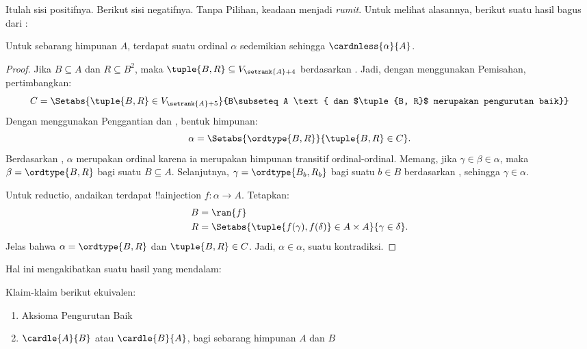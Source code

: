 \documentclass[../../../include/open-logic-section]{subfiles}
\begin{document}

Itulah sisi positifnya. Berikut sisi negatifnya. Tanpa Pilihan, keadaan
menjadi \emph{rumit}. Untuk melihat alasannya, berikut suatu hasil bagus dari
\cite{Hartogs1915}:

\begin{lem}
Untuk sebarang himpunan $A$, terdapat suatu ordinal $\alpha$ sedemikian
sehingga $\cardnless{\alpha}{A}$.
\end{lem}

\begin{proof}
Jika $B \subseteq A$ dan $R \subseteq B^2$, maka $\tuple{B, R} \subseteq
V_{\setrank{A}+4}$ berdasarkan
. Jadi, dengan
menggunakan Pemisahan, pertimbangkan:
\[
	C = \Setabs{\tuple{B, R} \in V_{\setrank{A}+5}}{B\subseteq A
	\text{ dan $\tuple{B, R}$ merupakan pengurutan baik}}
\]
Dengan menggunakan Penggantian dan
, bentuk himpunan:
\[
	\alpha = \Setabs{\ordtype{B, R}}{\tuple{B, R} \in C}.
\]
Berdasarkan , $\alpha$
merupakan ordinal karena ia merupakan himpunan transitif ordinal-ordinal.
Memang, jika $\gamma \in \beta \in \alpha$, maka
$\beta = \ordtype{B, R}$ bagi suatu $B \subseteq A$. Selanjutnya,
$\gamma = \ordtype{B_b, R_b}$ bagi suatu $b \in B$ berdasarkan
, sehingga
$\gamma \in \alpha$.

Untuk reductio, andaikan terdapat !!a{injection}
$f \colon \alpha \to A$. Tetapkan:
\begin{align*}
	B &= \ran{f}\\
	R &= \Setabs{\tuple{f(\gamma), f(\delta)} \in A \times A}
	{\gamma \in \delta}.
\end{align*}
Jelas bahwa $\alpha = \ordtype{B, R}$ dan $\tuple{B, R} \in C$. Jadi,
$\alpha \in \alpha$, suatu kontradiksi.
\end{proof}

Hal ini mengakibatkan suatu hasil yang mendalam:

\begin{thm}
Klaim-klaim berikut ekuivalen:
\begin{enumerate}
	\item{} Aksioma Pengurutan Baik
	\item{} $\cardle{A}{B}$ atau
	$\cardle{B}{A}$, bagi sebarang himpunan $A$ dan $B$
\end{enumerate}
\end{thm}
\end{document}

